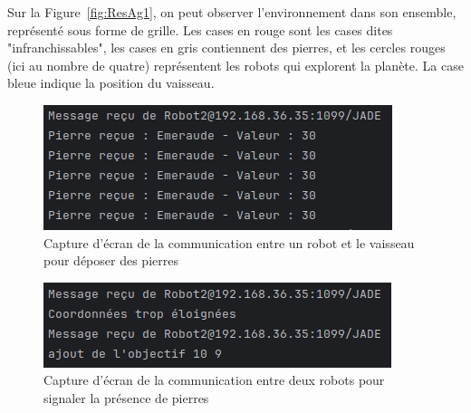 \documentclass{article}
\begin{document}
Sur la Figure~\ref{fig:ResAg1}, on peut observer l'environnement dans son ensemble, représenté sous forme de grille. Les cases en rouge sont les cases dites "infranchissables", les cases en gris contiennent des pierres, et les cercles rouges (ici au nombre de quatre) représentent les robots qui explorent la planète. La case bleue indique la position du vaisseau.

\begin{figure}[H]
    \begin{minipage}{\textwidth}
        \centering
        \includegraphics[scale=0.35]{./img/com_R-S.png}
        \caption{Capture d'écran de la communication entre un robot et le vaisseau pour déposer des pierres}
        \label{fig:ResAg2}
    \end{minipage}
\end{figure}

\begin{figure}[H]
    \begin{minipage}{\textwidth}
        \centering
        \includegraphics[scale=0.35]{./img/com_R-R.png}
        \caption{Capture d'écran de la communication entre deux robots pour signaler la présence de pierres}
        \label{fig:ResAg3}
    \end{minipage}
\end{figure}
\end{document}
